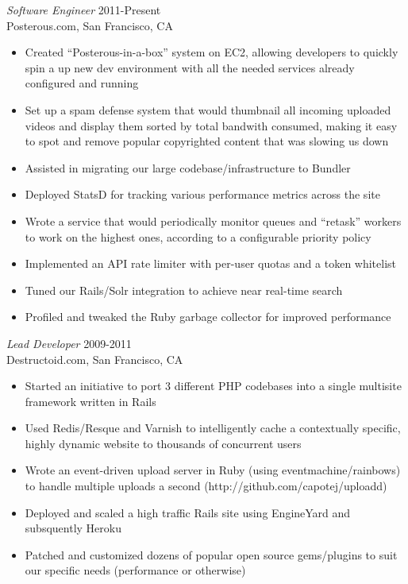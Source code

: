 \documentclass[margin]{res}
\begin{document}
\begin{resume}
  {\sl Software Engineer } \hfill 2011-Present \\
  Posterous.com, San Francisco, CA
  \begin{itemize}  \itemsep -2pt %
    \item Created ``Posterous-in-a-box'' system on EC2, allowing developers to quickly spin a up new dev environment with all the needed services already configured and running
    \item Set up a spam defense system that would thumbnail all incoming uploaded videos and display them sorted by total bandwith consumed, making it easy to spot and remove popular copyrighted content that was slowing us down
    \item Assisted in migrating our large codebase/infrastructure to Bundler
    \item Deployed StatsD for tracking various performance metrics across the site
    \item Wrote a service that would periodically monitor queues and ``retask'' workers to work on the highest ones, according to a configurable priority policy
    \item Implemented an API rate limiter with per-user quotas and a token whitelist
    \item Tuned our Rails/Solr integration to achieve near real-time search
    \item Profiled and tweaked the Ruby garbage collector for improved performance


  \end{itemize}


  {\sl Lead Developer } \hfill 2009-2011 \\
  Destructoid.com, San Francisco, CA
  \begin{itemize}  \itemsep -2pt %
    \item Started an initiative to port 3 different PHP codebases into a single multisite framework written in Rails
    \item Used Redis/Resque and Varnish to intelligently cache a contextually specific, highly dynamic website to thousands of concurrent users
    \item Wrote an event-driven upload server in Ruby (using eventmachine/rainbows) to handle multiple uploads a second (http://github.com/capotej/uploadd)
    \item Deployed and scaled a high traffic Rails site using EngineYard and subsquently Heroku
    \item Patched and customized dozens of popular open source gems/plugins to suit our specific needs (performance or otherwise)
  \end{itemize}



\end{resume}
\end{document}

